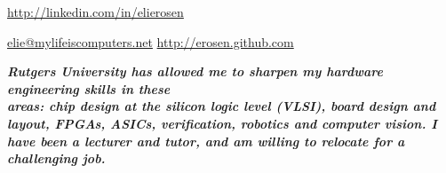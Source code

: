 \documentclass[10pt,a4paper]{article}
\begin{document}
\sloppy %

\centerline{\noindent\href{http://www.linkedin.com/in/elierosen}{http://linkedin.com/in/elierosen}}

\nobreakvspace{0.3em} %

\noindent\href{mailto:elie@mylifeiscomputers.net}{elie\mbox{}@\mbox{}mylifeiscomputers.net} \hfill \href{http://erosen.github.com}{http://erosen.github.com} \\

\spacedhrule{-0.6em}{-0.4em} %

\headedsection
{\textbf{\emph{\large{Rutgers University has allowed me to sharpen my hardware engineering skills in these\\ areas: chip design at the silicon logic level (VLSI), board design and layout, FPGAs, ASICs, verification, robotics and computer vision. I have been a lecturer and tutor, and am willing to relocate for a challenging job.} }}}


\spacedhrule{0.6em}{-0.4em}


	
		{}
	
		{}

		{}
\end{document}
